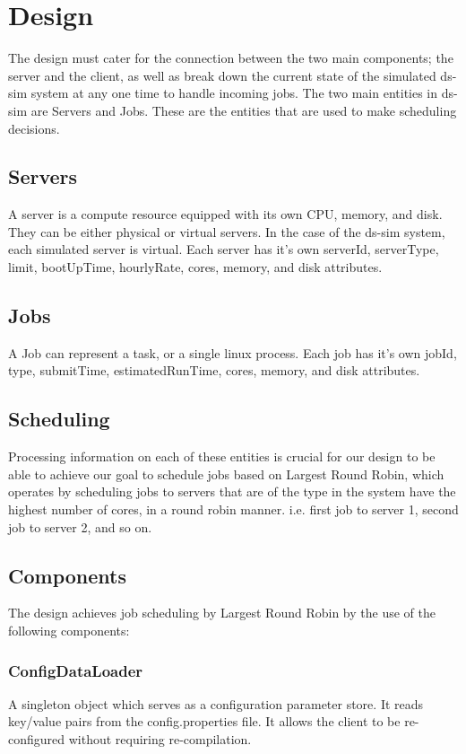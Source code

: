 \documentclass[a4paper]{article}
\begin{document}
\section{Design}
\label{sec:section3}
The design must cater for the connection between the two main components; the server and the client, as well as break down the current state of the simulated ds-sim system at any one time to handle incoming jobs. The two main entities in ds-sim are Servers and Jobs. These are the entities that are used to make scheduling decisions.

\subsection{Servers}
A server is a compute resource equipped with its own CPU, memory, and disk. They can be either physical or virtual servers. In the case of the ds-sim system, each simulated server is virtual. Each server has it's own serverId, serverType, limit, bootUpTime, hourlyRate, cores, memory, and disk attributes.

\subsection{Jobs}
A Job can represent a task, or a single linux process. Each job has it's own jobId, type, submitTime, estimatedRunTime, cores, memory, and disk attributes.

\subsection{Scheduling}
Processing information on each of these entities is crucial for our design to be able to achieve our goal to schedule jobs based on Largest Round Robin, which operates by scheduling jobs to servers that are of the type in the system have the highest number of cores, in a round robin manner. i.e. first job to server 1, second job to server 2, and so on.
\subsection{Components}
The design achieves job scheduling by Largest Round Robin by the use of the following components:

\subsubsection*{ConfigDataLoader}
A singleton object which serves as a configuration parameter store. It reads key/value pairs from the config.properties file. It allows the client to be re-configured without requiring re-compilation.
\end{document}
